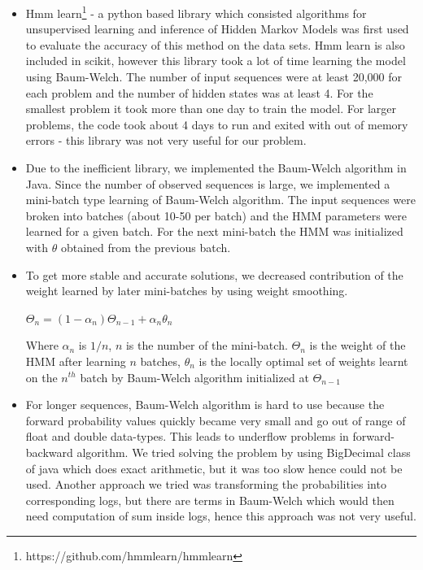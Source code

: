 \documentclass[letterpaper]{article}
\begin{document}
\begin{itemize}
	\item Hmm learn\footnote{https://github.com/hmmlearn/hmmlearn} - a python based library which consisted algorithms for unsupervised learning and inference of Hidden Markov Models was first used to evaluate the accuracy of this method on the data sets. Hmm learn is also included in scikit, however this library took a lot of time learning the model using Baum-Welch. The number of input sequences were at least 20,000 for each problem and the number of hidden states was at least 4. For the smallest problem it took more than one day to train the model. For larger problems, the code took about 4 days to run and exited with out of memory errors - this library was not very useful for our problem.
	      
	\item Due to the inefficient library, we implemented the Baum-Welch algorithm in Java. Since the number of observed sequences is large, we implemented a mini-batch type learning of Baum-Welch algorithm. The input sequences were broken into batches (about 10-50 per batch) and the HMM parameters were learned for a given batch. For the next mini-batch the HMM was initialized with $\theta$ obtained from the previous batch.
	      
	\item To get more stable and accurate solutions, we decreased contribution of the weight learned by later mini-batches by using weight smoothing.
	      
	      \begin{center}
	      	$\Theta_{n} = (1-\alpha_{n})\Theta_{n-1} + \alpha_{n} \theta_{n}$
	      \end{center}
	      
	      Where $\alpha_{n}$ is $1/n$, $n$ is the number of the mini-batch. $\Theta_{n}$ is the weight of the HMM after learning $n$ batches, $\theta_{n}$ is the locally optimal set of weights learnt on the $n^{th}$ batch by Baum-Welch algorithm initialized at $\Theta_{n-1}$ 
	      
	      
	\item For longer sequences, Baum-Welch algorithm is hard to use because the forward probability values quickly became very small and go out of range of float and double data-types. This leads to underflow problems in forward-backward algorithm. We tried solving the problem by using BigDecimal class of java which does exact arithmetic, but it was too slow hence could not be used. Another approach we tried was transforming the probabilities into corresponding logs, but there are terms in Baum-Welch which would then need computation of sum inside logs, hence this approach was not very useful.   
	      

\end{itemize}
\end{document}
